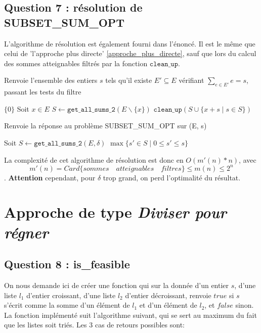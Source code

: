 \documentclass[10pt]{article}
\let\oldReturn\Return
\renewcommand{\Return}{\State\oldReturn}
\begin{document}
			\subsection{Question 7 : résolution de SUBSET\_SUM\_OPT}
				L'algorithme de résolution est également fourni dans l'énoncé.
				Il est le même que celui de 'l'approche plus directe' \ref{approche_plus_directe}, sauf que
				lors du calcul des sommes atteignables filtrés par la fonction $\mathtt{clean\_up}$.
				
				\begin{algorithm}
					\caption{Renvoie l'ensemble des entiers $s$ tels qu'il existe
							$E' \subseteq E$ vérifiant $\sum\limits_{e \in E'}e = s$, passant les tests du filtre}
					\begin{algorithmic}[1]
								\Return $\{0\}$
							\EndIf
							\State Soit $x \in E$
							\State $S \leftarrow \mathtt{get\_all\_sums\_2}(E \backslash \{x\})$
							\Return $\mathtt{clean\_up}(S \cup \{x + s \mid s \in S\})$
						\EndFunction
					\end{algorithmic}
				\end{algorithm}
			
			\begin{algorithm}
				\caption{Renvoie la réponse au problème SUBSET\_SUM\_OPT sur (E, s)}
				\begin{algorithmic}[1]
					\Function{subset\_sum}{$E \subset \mathbb{N}, s \in \mathbb{N}$}
						\State Soit $S \leftarrow \mathtt{get\_all\_sums\_2}(E, \delta)$
						\Return $\max\{s' \in S \mid 0 \leq s' \leq s\}$
					\EndFunction
				\end{algorithmic}
			\end{algorithm}
			La complexité de cet algorithme de résolution est donc en $\boxed{O(m'(n) * n)}$,
			avec $$m'(n) = Card\{sommes \quad atteignables \quad filtres\} \leq m(n) \leq 2^n$$.
			\textbf{Attention} cependant, pour $\delta$ trop grand, on perd l'optimalité du résultat.

		\newpage
		\section{Approche de type \textit{Diviser pour régner}}\label{approche_diviser_pour_regner}
			\subsection{Question 8 : is\_feasible}\label{is_feasible}
				On nous demande ici de créer une fonction qui sur la donnée d'un entier $s$, d'une liste $l_1$ d'entier croissant,
				d'une liste $l_2$ d'entier décroissant, renvoie $true$ si $s$ s'écrit comme la somme d'un élément de $l_1$ et d'un
				élément de $l_2$, et $false$ sinon.
				\newline
				La fonction implémenté suit l'algorithme suivant, qui se sert au maximum du fait que les listes soit triés.
				Les 3 cas de retours possibles sont:
				
\end{document}
